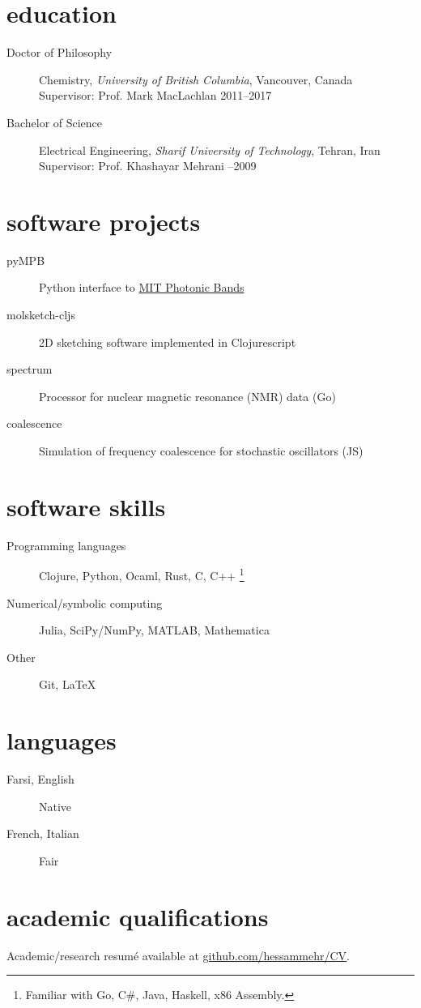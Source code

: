\documentclass[overlapped,line,10pt,letterpaper]{res}
\begin{document}
\begin{resume}
\section{education}
\begin{description}
\item [Doctor of Philosophy] Chemistry, \emph{University of British Columbia}, Vancouver, Canada   \\ Supervisor: Prof. Mark MacLachlan \hspace{\fill} 2011–2017
\item [Bachelor of Science] Electrical Engineering, \emph{Sharif University of Technology}, Tehran, Iran \\ Supervisor: Prof. Khashayar Mehrani \hspace{}–2009
\end{description}

\section{software projects}
\begin{description}
\item[pyMPB] Python interface to \href{http://ab-initio.mit.edu/wiki/index.php/MIT_Photonic_Bands}{MIT Photonic Bands}
\item[molsketch-cljs] 2D sketching software implemented in Clojurescript
\item[spectrum] Processor for nuclear magnetic resonance (NMR) data (Go)
\item[coalescence] Simulation of frequency coalescence for stochastic oscillators (JS)
\end{description}

\section{software skills}
\begin{description}
\item[Programming languages] Clojure, Python, Ocaml, Rust, C, C++ \footnote{Familiar with Go, C\#, Java, Haskell, x86 Assembly.}
\item[Numerical/symbolic computing] Julia, SciPy/NumPy, MATLAB, Mathematica
\item[Other] Git, \LaTeX
\end{description}

\section{languages}
\begin{description}
\item[Farsi, English] Native
\item[French, Italian] Fair
\end{description}

\section{academic qualifications}
Academic/research resumé available at \href{https://github.com/hessammehr/CV/raw/master/myCV.pdf}{github.com/hessammehr/CV}.
\end{resume}
\end{document}
